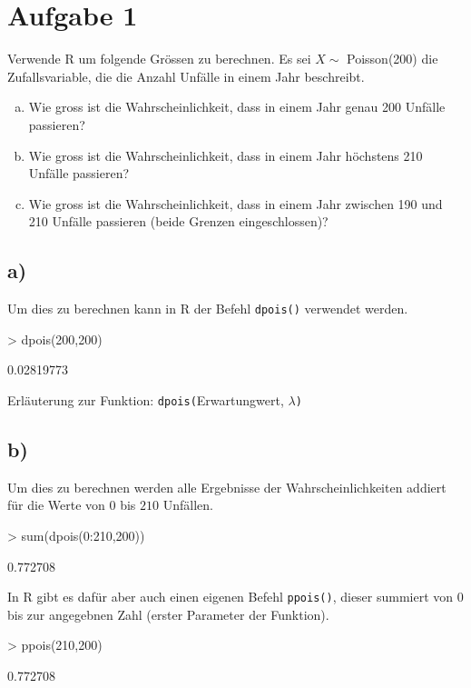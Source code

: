 \section{Aufgabe 1}
Verwende R um folgende Grössen zu berechnen. Es sei $X \sim$ Poisson(200) die
Zufallsvariable, die die Anzahl Unfälle in einem Jahr beschreibt.

\begin{enumerate}[(a)]
    \item Wie gross ist die Wahrscheinlichkeit, dass in einem Jahr genau
          200 Unfälle passieren?
    \item Wie gross ist die Wahrscheinlichkeit, dass in einem Jahr höchstens
          210 Unfälle passieren?
    \item Wie gross ist die Wahrscheinlichkeit, dass in einem Jahr zwischen
          190 und 210 Unfälle passieren (beide Grenzen eingeschlossen)?
\end{enumerate}

\subsection*{a)}
Um dies zu berechnen kann in R der Befehl \verb!dpois()! verwendet werden.
\begin{Schunk}
\begin{Sinput}
> dpois(200,200)
\end{Sinput}
\begin{Soutput}
[1] 0.02819773
\end{Soutput}
\end{Schunk}
Erläuterung zur Funktion: \verb!dpois(!Erwartungwert, $\lambda$\verb!)!

\subsection*{b)}
Um dies zu berechnen werden alle Ergebnisse der Wahrscheinlichkeiten addiert
für die Werte von $0$ bis $210$ Unfällen.
\begin{Schunk}
\begin{Sinput}
> sum(dpois(0:210,200))
\end{Sinput}
\begin{Soutput}
[1] 0.772708
\end{Soutput}
\end{Schunk}
In R gibt es dafür aber auch einen eigenen Befehl \verb!ppois()!, dieser
summiert von $0$ bis zur angegebnen Zahl (erster Parameter der Funktion).
\begin{Schunk}
\begin{Sinput}
> ppois(210,200)
\end{Sinput}
\begin{Soutput}
[1] 0.772708
\end{Soutput}
\end{Schunk}

